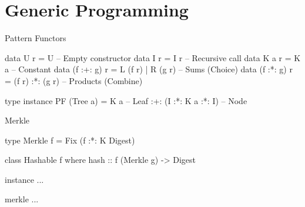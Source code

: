 \section{Generic Programming}

\begin{slide}{Pattern Functors}
\begin{haskell}
data U r         = U                 -- Empty constructor
data I r         = I r               -- Recursive call
data K a r       = K a               -- Constant
data (f :+: g) r = L (f r) | R (g r) -- Sums (Choice)
data (f :*: g) r = (f r) :*: (g r)   -- Products (Combine)
\end{haskell}

\begin{haskell}
type instance PF (Tree a) = K a                -- Leaf
                         :+: (I :*: K a :*: I) -- Node
\end{haskell}
\end{slide}

\begin{slide}{Merkle}
\begin{haskell}
type Merkle f = Fix (f :*: K Digest)

class Hashable f where
  hash :: f (Merkle g) -> Digest

instance ...

merkle ...
\end{haskell}
\end{slide}